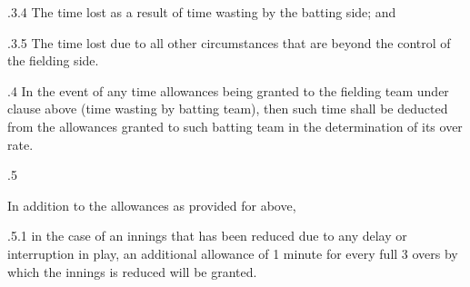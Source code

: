 \documentclass[12pt]{article}
\begin{document}
\vspace{\baselineskip}
\begin{adjustwidth}{0.49in}{0.0in}
{\fontsize{9pt}{10.8pt}.3.4 \tabto{1.17in} The time lost as a result of time wasting by the batting side; and\par}\par

\end{adjustwidth}


\vspace{\baselineskip}
\begin{adjustwidth}{0.49in}{0.0in}
{\fontsize{9pt}{10.8pt}.3.5 \tabto{1.17in} The time lost due to all other circumstances that are beyond the control of the fielding side.\par}\par

\end{adjustwidth}


\vspace{\baselineskip}
\begin{adjustwidth}{0.5in}{0.24in}
{\fontsize{9pt}{10.8pt}.4 \tabto{0.49in} In the event of any time allowances being granted to the fielding team under clause above (time wasting by batting team), then such time shall be deducted from the allowances granted to such batting team in the determination of its over rate.\par}\par

\end{adjustwidth}


\vspace{\baselineskip}
{\fontsize{9pt}{10.8pt}.5 \tabto{0.49in} {\fontsize{8pt}{9.6pt}\selectfont In addition to the allowances as provided for above,\par}\par}\par


\vspace{\baselineskip}
\begin{adjustwidth}{1.18in}{0.24in}
{\fontsize{9pt}{10.8pt}.5.1 \tabto{1.17in} in the case of an innings that has been reduced due to any delay or interruption in play, an additional allowance of 1 minute for every full 3 overs by which the innings is reduced will be granted.\par}\par

\end{adjustwidth}
\end{document}
